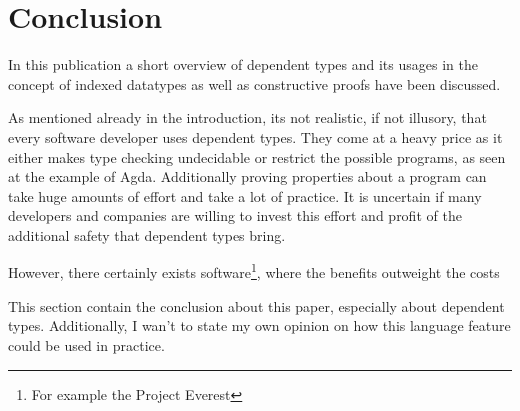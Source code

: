 \section{Conclusion}
In this publication a short overview of dependent types and its usages in the concept of indexed datatypes as well as constructive proofs have been discussed.

As mentioned already in the introduction, its not realistic, if not illusory, that every software developer uses dependent types. 
They come at a heavy price as it either makes type checking undecidable or restrict the possible programs, as seen at the example of Agda.
Additionally proving properties about a program can take huge amounts of effort and take a lot of practice.
It is uncertain if many developers and companies are willing to invest this effort and profit of the additional safety that dependent types bring.

However, there certainly exists software\footnote{For example the Project Everest\cite{project_everest_github_io}}, where the benefits outweight the costs 


This section contain the conclusion about this paper, especially about dependent types. 
Additionally, I wan't to state my own opinion on how this language feature could be used in practice.